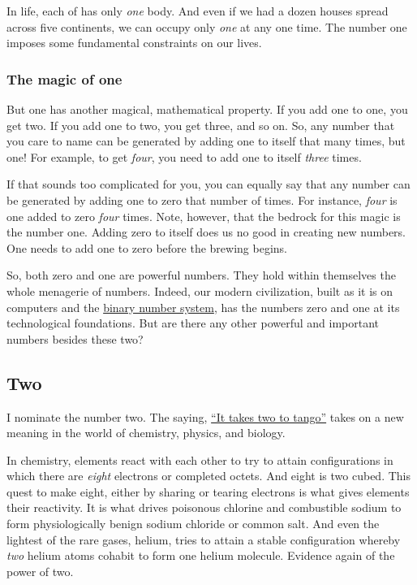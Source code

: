 \documentclass[
  a4paper,
]{article}
\begin{document}
In life, each of has only \emph{one} body. And even if we had a dozen
houses spread across five continents, we can occupy only \emph{one} at
any one time. The number one imposes some fundamental constraints on our
lives.

\hypertarget{the-magic-of-one}{%
\subsubsection{The magic of one}\label{the-magic-of-one}}

But one has another magical, mathematical property. If you add one to
one, you get two. If you add one to two, you get three, and so on. So,
any number that you care to name can be generated by adding one to
itself that many times, but one! For example, to get \emph{four}, you
need to add one to itself \emph{three} times.

If that sounds too complicated for you, you can equally say that any
number can be generated by adding one to zero that number of times. For
instance, \emph{four} is one added to zero \emph{four} times. Note,
however, that the bedrock for this magic is the number one. Adding zero
to itself does us no good in creating new numbers. One needs to add one
to zero before the brewing begins.

So, both zero and one are powerful numbers. They hold within themselves
the whole menagerie of numbers. Indeed, our modern civilization, built
as it is on computers and the
\href{https://www.britannica.com/science/binary-number-system}{binary
number system}, has the numbers zero and one at its technological
foundations. But are there any other powerful and important numbers
besides these two?

\hypertarget{two}{%
\subsection{Two}\label{two}}

I nominate the number two. The saying,
\href{https://dictionary.cambridge.org/dictionary/english/it-takes-two-to-tango}{``It
takes two to tango''} takes on a new meaning in the world of chemistry,
physics, and biology.

In chemistry, elements react with each other to try to attain
configurations in which there are \emph{eight} electrons or completed
octets. And eight is two cubed. This quest to make eight, either by
sharing or tearing electrons is what gives elements their reactivity. It
is what drives poisonous chlorine and combustible sodium to form
physiologically benign sodium chloride or common salt. And even the
lightest of the rare gases, helium, tries to attain a stable
configuration whereby \emph{two} helium atoms cohabit to form one helium
molecule. Evidence again of the power of two.
\end{document}
